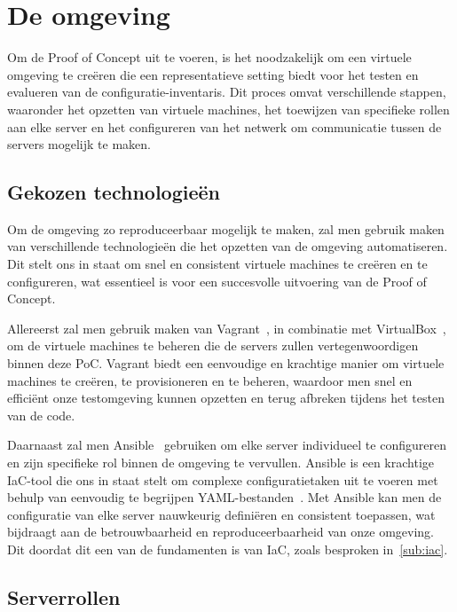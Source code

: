 \section{De omgeving}
\label{poc_omgeving}

Om de Proof of Concept uit te voeren, is het noodzakelijk om een virtuele omgeving te cre\"eren die een representatieve setting biedt voor het testen en evalueren van de configuratie-inventaris.
Dit proces omvat verschillende stappen, waaronder het opzetten van virtuele machines, het toewijzen van specifieke rollen aan elke server en het configureren van het netwerk om communicatie tussen de servers mogelijk te maken.

\subsection{Gekozen technologie{\"e}n}
\label{poc_gekozen_technologieen}

Om de omgeving zo reproduceerbaar mogelijk te maken, zal men gebruik maken van verschillende technologie\"en die het opzetten van de omgeving automatiseren.
Dit stelt ons in staat om snel en consistent virtuele machines te cre\"eren en te configureren, wat essentieel is voor een succesvolle uitvoering van de Proof of Concept.

Allereerst zal men gebruik maken van Vagrant~\autocite{vagrant-home}, in combinatie met VirtualBox~\autocite{virtualbox-home}, om de virtuele machines te beheren die de servers zullen vertegenwoordigen binnen deze PoC.
Vagrant biedt een eenvoudige en krachtige manier om virtuele machines te cre\"eren, te provisioneren en te beheren, waardoor men snel en effici\"ent onze testomgeving kunnen opzetten en terug afbreken tijdens het testen van de code.

Daarnaast zal men Ansible~\autocite{ansible-home} gebruiken om elke server individueel te configureren en zijn specifieke rol binnen de omgeving te vervullen.
Ansible is een krachtige IaC-tool die ons in staat stelt om complexe configuratietaken uit te voeren met behulp van eenvoudig te begrijpen YAML-bestanden~\autocite{ansible-docs-yaml}.
Met Ansible kan men de configuratie van elke server nauwkeurig defini\"eren en consistent toepassen, wat bijdraagt aan de betrouwbaarheid en reproduceerbaarheid van onze omgeving.
Dit doordat dit een van de fundamenten is van IaC, zoals besproken in~\ref{sub:iac}.

\subsection{Serverrollen}
\label{poc_serverrollen}

